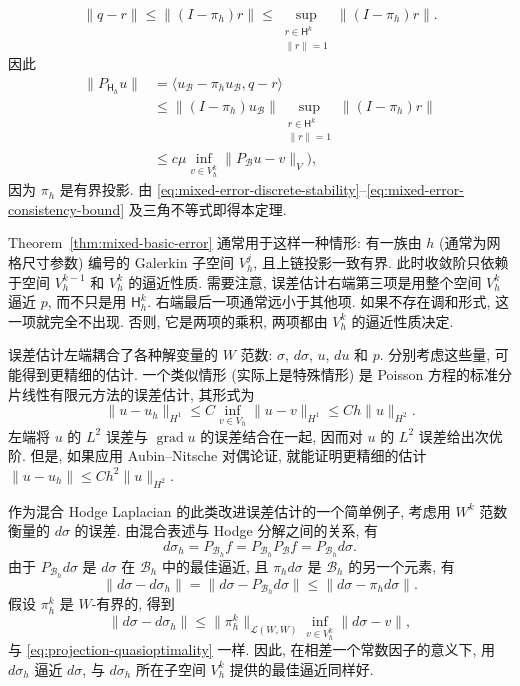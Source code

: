 \begin{Proof}
\[
\|q-r\|\leq\|(I-\pi_h)r\|\leq\sup_{\substack{r\in\mathsf H^k\\\|r\|=1}}\|(I-\pi_h)r\|.
\]
{因此}
\begin{equation}\label{eq:mixed-error-consistency-bound}
\begin{aligned}
\|P_{\mathsf H_h}u\|&=\langle u_{\mathcal B}-\pi_hu_{\mathcal B},q-r\rangle\\
&\leq\|(I-\pi_h)u_{\mathcal B}\|\sup_{\substack{r\in\mathsf H^k\\\|r\|=1}}\|(I-\pi_h)r\|\\
&\leq c\mu\inf_{v\in V_h^k}\|P_{\mathcal B}u-v\|_V),
\end{aligned}
\end{equation}
{因为 $\pi_h$ 是有界投影. 由 \eqref{eq:mixed-error-discrete-stability}--\eqref{eq:mixed-error-consistency-bound} 及三角不等式即得本定理.}
\end{Proof}

{Theorem~\ref{thm:mixed-basic-error} 通常用于这样一种情形: 有一族由 $h$ (通常为网格尺寸参数) 编号的 Galerkin 子空间 $V_h^j$, 且上链投影一致有界. 此时收敛阶只依赖于空间 $V_h^{k-1}$ 和 $V_h^k$ 的逼近性质. 需要注意, 误差估计右端第三项是用整个空间 $V_h^k$ 逼近 $p$, 而不只是用 $\mathsf H_h^k$. 右端最后一项通常远小于其他项. 如果不存在调和形式, 这一项就完全不出现. 否则, 它是两项的乘积, 两项都由 $V_h^k$ 的逼近性质决定.}

{误差估计左端耦合了各种解变量的 $W$ 范数: $\sigma$, $d\sigma$, $u$, $du$ 和 $p$. 分别考虑这些量, 可能得到更精细的估计. 一个类似情形 (实际上是特殊情形) 是 Poisson 方程的标准分片线性有限元方法的误差估计, 其形式为}
\[
\|u-u_h\|_{H^1}\leq C\inf_{v\in V_h}\|u-v\|_{H^1}\leq Ch\|u\|_{H^2}.
\]
{左端将 $u$ 的 $L^2$ 误差与 $\operatorname{grad}u$ 的误差结合在一起, 因而对 $u$ 的 $L^2$ 误差给出次优阶. 但是, 如果应用 Aubin–Nitsche 对偶论证, 就能证明更精细的估计 $\|u-u_h\|\leq Ch^2\|u\|_{H^2}$.}

{作为混合 Hodge Laplacian 的此类改进误差估计的一个简单例子, 考虑用 $W^k$ 范数衡量的 $d\sigma$ 的误差. 由混合表述与 Hodge 分解之间的关系, 有}
\[
d\sigma_h=P_{\mathcal B_h}f=P_{\mathcal B_h}P_{\mathcal B}f=P_{\mathcal B_h}d\sigma.
\]
{由于 $P_{\mathcal B_h}d\sigma$ 是 $d\sigma$ 在 $\mathcal B_h$ 中的最佳逼近, 且 $\pi_hd\sigma$ 是 $\mathcal B_h$ 的另一个元素, 有}
\[
\|d\sigma-d\sigma_h\|=\|d\sigma-P_{\mathcal B_h}d\sigma\|\leq\|d\sigma-\pi_hd\sigma\|.
\]
{假设 $\pi_h^k$ 是 $W$-有界的, 得到}
\[
\|d\sigma-d\sigma_h\|\leq\|\pi_h^k\|_{\mathcal L(W,W)}\inf_{v\in V_h^k}\|d\sigma-v\|,
\]
{与 \eqref{eq:projection-quasioptimality} 一样. 因此, 在相差一个常数因子的意义下, 用 $d\sigma_h$ 逼近 $d\sigma$, 与 $d\sigma_h$ 所在子空间 $V_h^k$ 提供的最佳逼近同样好.}

